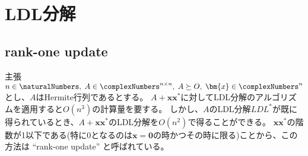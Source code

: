 \chapter{LDL分解}
    \section{rank-one update}
        \begin{itembox}[l]{主張}
            $n\in\naturalNumbers,\;A\in\complexNumbers^{n\times n},\;A\succeq O,\;\bm{x}\in\complexNumbers^n$とし、$A$はHermite行列であるとする。
            $A+\bm{x}\bm{x}^*$に対してLDL分解のアルゴリズムを適用すると$O(n^3)$の計算量を要する。
            しかし、$A$のLDL分解$LDL^*$が既に得られているとき、$A+\bm{x}\bm{x}^*$のLDL分解を$O(n^2)$で得ることができる。
            $\bm{x}\bm{x}^*$の階数が1以下である(特に0となるのは$\bm{x}=\bm{0}$の時かつその時に限る)ことから、この方法は ``rank-one update'' と呼ばれている。
        \end{itembox}
